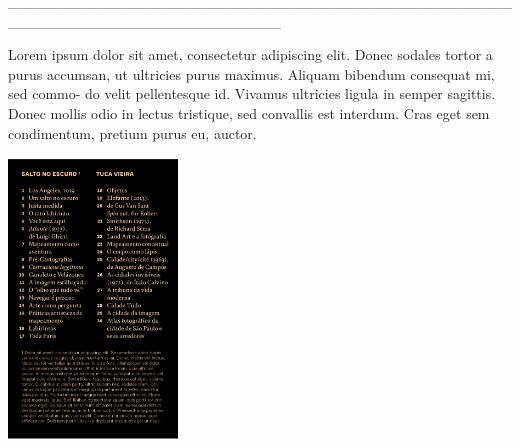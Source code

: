 \hspace*{-2cm}\_\_\_\_\_\_\_\_\_\_\_\_\_\_\_\_\_\_\_\_\_\_\_\_\_\_\_\_\_\_\_\_\_\_\_\_\_\_\_\_\_\_\_\_\_\_\_\_\_\_\_\_\_\_\_\_\_\_\_\_\_\_\_\_\_\_\_\_\_\_\_\_\_\_

\medskip

\noindent{}Lorem ipsum dolor sit amet, consectetur adipiscing elit.
Donec sodales tortor a purus accumsan, ut ultricies purus
maximus. Aliquam bibendum consequat mi, sed commo-
do velit pellentesque id. Vivamus ultricies ligula in semper
sagittis. Donec mollis odio in lectus tristique, sed convallis
est interdum. Cras eget sem condimentum, pretium purus
eu, auctor.

\vfill

\hspace*{-.4cm}\begin{minipage}[c]{1\linewidth}
\small{
{}}
\end{minipage}


\pagebreak

\hspace{.5cm}

\begin{center}
\hspace*{-.5cm}\includegraphics[width=45mm]{./imgs/escuro.png}
\end{center}

